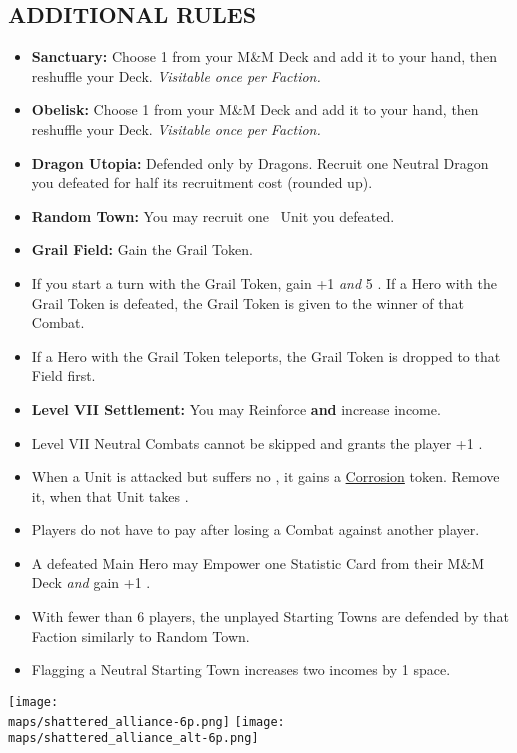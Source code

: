 \begin{multicols*}{2}
\subsection*{\MakeUppercase{Additional Rules}}
\begin{itemize}
  \item \textbf{Sanctuary:} Choose 1  from your M\&M Deck and add it to your hand, then reshuffle your Deck. \textit{Visitable once per Faction.}
  \item \textbf{Obelisk:} Choose 1  from your M\&M Deck and add it to your hand, then reshuffle your Deck. \textit{Visitable once per Faction.}
  \item \textbf{Dragon Utopia:} Defended only by Dragons. Recruit one Neutral Dragon you defeated for half its recruitment cost (rounded up). 
  \item \textbf{Random Town:} You may recruit one \silver\ Unit you defeated.
  \item \textbf{Grail Field:} Gain the Grail Token.
  \item If you start a turn with the Grail Token, gain +1  \textit{and} 5 . If a Hero with the Grail Token is defeated, the Grail Token is given to the winner of that Combat.
  \item If a Hero with the Grail Token teleports, the Grail Token is dropped to that Field first.
  \item \textbf{Level VII Settlement:} You may Reinforce \textbf{and} increase income. %
  \item Level VII Neutral Combats cannot be skipped and grants the player +1 .
  \item When a Unit is attacked but suffers no , it gains a \href{https://archon-studio.com/files/manuals/homm/HoMM-Stronghold-Mission-Book-Beta_EN.pdf}{Corrosion} token. Remove it, when that Unit takes .
\item Players do not have to pay  after losing a Combat against another player.
  \item A defeated Main Hero may Empower one Statistic Card from their M\&M Deck \textit{and} gain +1 .
  \item With fewer than 6 players, the unplayed Starting Towns are defended by that Faction similarly to Random Town.
  \item Flagging a Neutral Starting Town increases two incomes by 1 space.
\end{itemize}

\begin{center}
  \vfill
  \texttt{[image: \\maps/shattered\_alliance-6p.png]}
  \vfill
  \texttt{[image: \\maps/shattered\_alliance\_alt-6p.png]}
\end{center}

\end{multicols*}